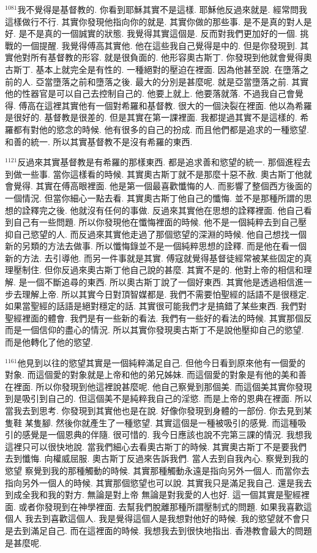 \documentclass{book}
\begin{document}
$^{1081}$我不覺得是基督教的.
你看到耶穌其實不是這樣.
耶穌他反過來就是.
經常問我這樣做行不行.
其實你發現他指向你的就是.
其實你做的那些事.
是不是真的對人是好.
是不是真的一個誠實的狀態.
我覺得其實這個是.
反而對我們更加好的一個.
挑戰的一個提醒.
我覺得傅高其實他.
他在這些我自己覺得是中的.
但是你發現到.
其實他對所有基督教的形容.
就是很負面的.
他形容奧古斯丁.
你發現到他就會覺得奧古斯丁.
基本上就完全是有性的.
一種絕對的壓迫在裡面.
因為他甚至說.
在墮落之前的人.
亞當墮落之前和墮落之後.
最大的分別是甚麼呢.
就是亞當墮落之前.
其實他的性器官是可以自己去控制自己的.
他要上就上.
他要落就落.
不過我自己會覺得.
傅高在這裡其實他有一個對希羅和基督教.
很大的一個決裂在裡面.
他以為希羅是很好的.
基督教是很差的.
但是其實在第一課裡面.
我都提過其實不是這樣的.
希羅都有對他的慾念的時候.
他有很多的自己的扮成.
而且他們都是追求的一種慾望.
和善的統一.
所以其實基督教不是沒有希羅的東西.

$^{1121}$反過來其實基督教是有希羅的那樣東西.
都是追求善和慾望的統一.
那個進程去到做一些事.
當你這樣看的時候.
其實奧古斯丁就不是那麼十惡不赦.
奧古斯丁他就會覺得.
其實在傅高眼裡面.
他是第一個最喜歡懺悔的人.
而影響了整個西方後面的一個情況.
但當你細心一點去看.
其實奧古斯丁他自己的懺悔.
並不是那種所謂的思想的詮釋完之後.
他就沒有任何的事做.
反過來其實他在思想的詮釋裡面.
他自己看到自己有一些問題.
所以你發現他在懺悔裡面的時候.
他不是一個純粹去到自己壓抑自己慾望的人.
而反過來其實他走過了那個慾望的深淵的時候.
他自己想找一個新的另類的方法去做事.
所以懺悔錄並不是一個純粹思想的詮釋.
而是他在看一個新的方法.
去引導他.
而另一件事就是其實.
傅寇就覺得基督徒經常被某些固定的真理壓制住.
但你反過來奧古斯丁他自己說的甚麼.
其實不是的.
他對上帝的相信和理解.
是一個不斷追尋的東西.
所以奧古斯丁說了一個好東西.
其實他是透過相信進一步去理解上帝.
所以其實今日對頂智媒都是.
我們不需要怕聖經的話語不是很穩定.
如果當聖經的話語是絕對穩定的話.
其實很可能我們才是搞錯了某些東西.
我們對聖經裡面的體會.
我們是有一些新的看法.
我們有一些好的看法的時候.
其實那個反而是一個信仰的盡心的情況.
所以其實你發現奧古斯丁不是說他壓抑自己的慾望.
而是他轉化了他的慾望.

$^{1161}$他見到以往的慾望其實是一個純粹滿足自己.
但他今日看到原來他有一個愛的對象.
而這個愛的對象就是上帝和他的弟兄姊妹.
而這個愛的對象是有他的美和善在裡面.
所以你發現到他這裡說甚麼呢.
他自己察覺到那個美.
而這個美其實你發現到是吸引到自己的.
但這個美不是純粹我自己的淫慾.
而是上帝的恩典在裡面.
所以當我去到思考.
你發現到其實他也是在說.
好像你發現到身體的一部份.
你去見到某隻鞋 某隻腳.
然後你就產生了一種慾望.
其實這個是一種被吸引的感覺.
而這種吸引的感覺是一個恩典的伴隨.
很可惜的.
我今日應該也說不完第三課的情況.
我想我這裡只可以很快地說.
當我們細心去看奧古斯丁的時候.
其實奧古斯丁不是要我們去到懺悔.
向權威屈服.
奧古斯丁反過來告訴我們.
當人去到自我內心.
察覺到我的慾望 察覺到我的那種觸動的時候.
其實那種觸動永遠是指向另外一個人.
而當你去指向另外一個人的時候.
其實那個慾望也可以說.
其實我只是滿足我自己.
還是我去到成全我和我的對方.
無論是對上帝 無論是對我愛的人也好.
這一個其實是聖經裡面.
或者你發現到在神學裡面.
去幫我們脫離那種所謂壓制式的問題.
如果我喜歡這個人 我去到喜歡這個人.
我是覺得這個人是我想對他好的時候.
我的慾望就不會只是去到滿足自己.
而在這裡面的時候.
我想我去到很快地指出.
香港教會最大的問題是甚麼呢.
\end{document}
